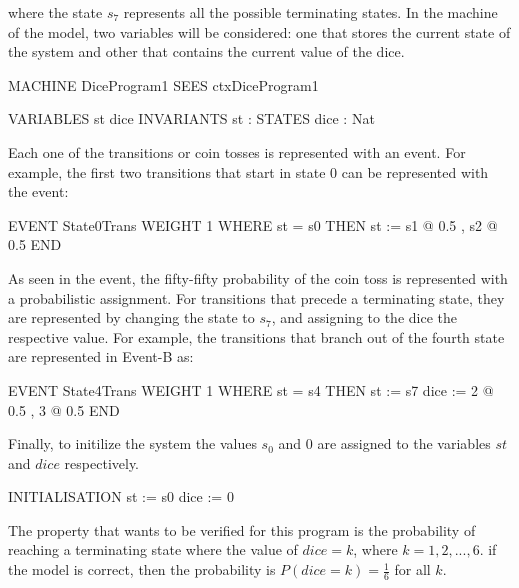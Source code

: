 where the state $s_7$ represents all the possible terminating states. In the machine of the model, two variables will be considered: one that stores the current state of the system and other that contains the current value of the dice.
\begin{maude}

MACHINE DiceProgram1
  SEES ctxDiceProgram1
  
  VARIABLES
    st 
    dice 
  INVARIANTS
    st : STATES
    dice : Nat 
\end{maude}
Each one of the transitions or coin tosses is represented with an event. For example, the first two transitions that start in state 0 can be represented with the event:
\begin{maude}

EVENT State0Trans 
WEIGHT 1
WHERE 
    st = s0
THEN
    st := {s1 @ 0.5 , s2 @ 0.5 }
END
\end{maude}
As seen in the event, the fifty-fifty probability of the coin toss is represented with a probabilistic assignment. For transitions that precede a terminating state, they are represented by changing the state to $s_7$, and assigning to the dice the respective value. For example, the transitions that branch out of the fourth state are represented in Event-B as:
\begin{maude}

EVENT State4Trans 
WEIGHT 1
WHERE 
    st = s4
THEN
    st := s7
    dice := {2 @ 0.5 , 3 @ 0.5 }
END    
\end{maude}
Finally, to initilize the system the values $s_0$ and 0 are assigned to the variables $st$ and $dice$ respectively.
\begin{maude}

INITIALISATION
    st := s0
    dice := 0
\end{maude}


The property that wants to be verified for this program is the probability of reaching a terminating state where the value of $dice = k$, where $k = 1,2,...,6$. if the model is correct, then the probability is $P(dice = k) = \frac{1}{6}$ for all $k$.

